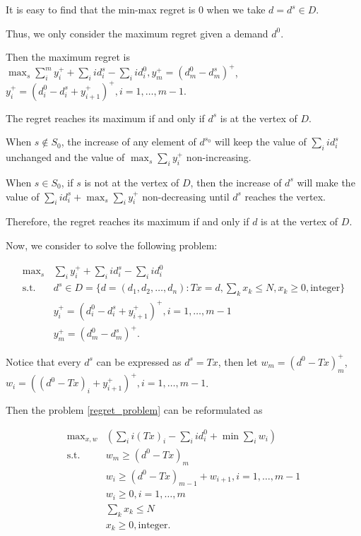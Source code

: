 It is easy to find that the min-max regret is 0 when we take $d = d^{s} \in D$.

Thus, we only consider the maximum regret given a demand $d^{0}$.

Then the maximum regret is $\max_{s} \sum_{i}^{m} y_{i}^{+} + \sum_{i} i d^{s}_{i} - \sum_{i} i d^{0}_{i}, y_{m}^{+} = (d_{m}^{0} - d_{m}^{s})^{+}$, $y_{i}^{+} = (d_{i}^{0} - d_{i}^{s} + y_{i+1}^{+})^{+}, i = 1, \ldots, m-1$.

\begin{thm}
  The regret reaches its maximum if and only if $d^{s}$ is at the vertex of $D$.
\end{thm}

When $s \notin S_0$, the increase of any element of $d^{s_0}$ will keep the value of $\sum_{i} i d^{s}_{i}$ unchanged and the value of $\max_{s} \sum_{i} y_{i}^{+}$ non-increasing.

When $s \in S_0$, if $s$ is not at the vertex of $D$, then the increase of $d^{s}$ will make the value of $\sum_{i} i d^{s}_{i} + \max_{s} \sum_{i} y_{i}^{+}$ non-decreasing until $d^{s}$ reaches the vertex.

Therefore, the regret reaches its maximum if and only if $d$ is at the vertex of $D$.

Now, we consider to solve the following problem:

\begin{equation}\label{regret_problem}
\begin{aligned}
  \mbox{max}_{s} & \sum_{i} y_{i}^{+} + \sum_{i} i d^{s}_{i} - \sum_{i} i d^{0}_{i} \\
  \mbox{s.t.} \quad & d^{s} \in D = \{d = (d_1,d_2,\ldots, d_n): Tx = d,\sum_{k} x_k \leq N, x_k \geq 0, \mbox{integer} \} \\
  & y_{i}^{+} = (d_{i}^{0} - d_{i}^{s} + y_{i+1}^{+})^{+}, i = 1, \ldots, m-1 \\
  & y_{m}^{+} = (d_{m}^{0} - d_{m}^{s})^{+}.
\end{aligned}
\end{equation}

Notice that every $d^{s}$ can be expressed as $d^{s} = Tx$, then let $w_{m} = (d^{0} - Tx)_{m}^{+}$, $w_{i} = ((d^{0} - Tx)_{i}+ y_{i+1}^{+})^{+}, i =1 ,\ldots, m-1$.
 
Then the problem \eqref{regret_problem} can be reformulated as 

\begin{equation}\label{regret_problem_1}
  \begin{aligned}
    \mbox{max}_{x,w} & (\sum_{i} i (Tx)_{i} - \sum_{i} i d^{0}_{i} + \min \sum_{i} w_{i}) \\
    \mbox{s.t.} \quad & w_m \geq (d^{0}- Tx)_{m} \\
    & w_{i} \geq (d^{0}- Tx)_{m-1} + w_{i+1}, i =1, \ldots,m-1 \\
    & w_i \geq 0, i =1, \ldots,m \\
    & \sum_{k} x_{k} \leq N \\
    & x_k \geq 0, \mbox{integer}.
  \end{aligned}
\end{equation}
  
